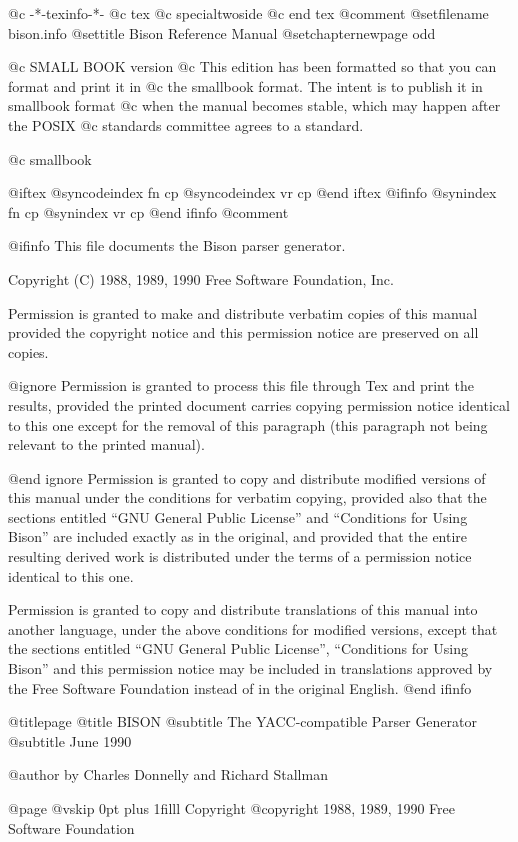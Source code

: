  @c -*-texinfo-*-
@c tex
@c special{twoside}
@c end tex
@comment %
@setfilename bison.info
@settitle Bison Reference Manual
@setchapternewpage odd

@c SMALL BOOK version   
@c This edition has been formatted so that you can format and print it in
@c the smallbook format.  The intent is to publish it in smallbook format
@c when the manual becomes stable, which may happen after the POSIX
@c standards committee agrees to a standard.

@c smallbook

@iftex
@syncodeindex fn cp
@syncodeindex vr cp
@end iftex
@ifinfo
@synindex fn cp
@synindex vr cp
@end ifinfo
@comment %

@ifinfo
This file documents the Bison parser generator.

Copyright (C) 1988, 1989, 1990 Free Software Foundation, Inc.

Permission is granted to make and distribute verbatim copies of
this manual provided the copyright notice and this permission notice
are preserved on all copies.

@ignore
Permission is granted to process this file through Tex and print the
results, provided the printed document carries copying permission
notice identical to this one except for the removal of this paragraph
(this paragraph not being relevant to the printed manual).

@end ignore
Permission is granted to copy and distribute modified versions of this
manual under the conditions for verbatim copying, provided also that the
sections entitled ``GNU General Public License'' and ``Conditions for
Using Bison'' are included exactly as in the original, and provided that
the entire resulting derived work is distributed under the terms of a
permission notice identical to this one.

Permission is granted to copy and distribute translations of this manual
into another language, under the above conditions for modified versions,
except that the sections entitled ``GNU General Public License'',
``Conditions for Using Bison'' and this permission notice may be
included in translations approved by the Free Software Foundation
instead of in the original English.
@end ifinfo

@titlepage
@title BISON
@subtitle The YACC-compatible Parser Generator
@subtitle June 1990

@author by Charles Donnelly and Richard Stallman

@page
@vskip 0pt plus 1filll
Copyright @copyright{} 1988, 1989, 1990 Free Software Foundation

